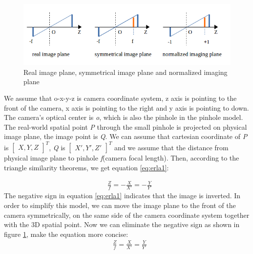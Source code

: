 \begin{figure}[h]
\centering
\includegraphics[scale=0.5]{./fig/3planes.png}
\caption{Real image plane, symmetrical image plane and normalized imaging plane}
\label{fig:3planes}
\end{figure}

We assume that o-x-y-z is camera coordinate system, z axis is pointing to the front of the camera, x axis is pointing to the right and y axis is pointing to down. The camera's optical center is \textit{o}, which is also the pinhole in the pinhole model. The real-world spatial point \textit{P} through the small pinhole is projected on physical image plane, the image point is \textit{Q}. We can assume that cartesian coordinate of \textit{P} is $\begin{bmatrix} X,Y,Z \end{bmatrix}^T$, \textit{Q} is $\begin{bmatrix} X',Y',Z' \end{bmatrix}^T$ and we assume that the distance from physical image plane to pinhole \textit{f}(camera focal length). Then, according to the triangle similarity theorems, we get equation \ref{eq:erla1}:

\begin{align}\label{eq:erla1}
&\frac{Z}{f} = -\frac{X}{X'} = -\frac{Y}{Y'}
\end{align}
The negative sign in equation \ref{eq:erla1} indicates that the image is inverted. In order to simplify this model, we can move the image plane to the front of the camera symmetrically, on the same side of the camera coordinate system together with the 3D spatial point. Now we can eliminate the negative sign as shown in figure \ref{fig:3planes}, make the equation more concise:
\begin{align}\label{eq:erla2}
&\frac{Z}{f} = \frac{X}{X'} = \frac{Y}{Y'}
\end{align}

